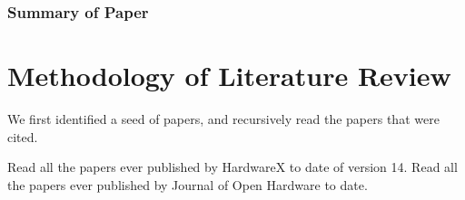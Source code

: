 \documentclass{article}
\begin{document}
\subsubsection{Summary of Paper}

\section{Methodology of Literature Review}
We first identified a seed of papers, and recursively read the papers that were cited.

Read all the papers ever published by HardwareX to date of version 14. 
Read all the papers ever published by Journal of Open Hardware to date.

\nocite{*}
\printbibliography
\end{document}
